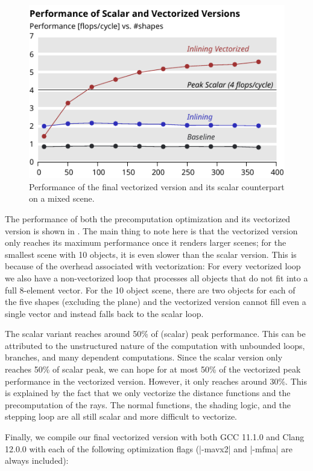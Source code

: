 \documentclass[letterpaper]{article}
\begin{document}
\begin{figure}[ht]
  \centering
  \includegraphics[page=4]{Figures/rep-all-perf.pdf}
  \caption{Performance of the final vectorized version and its scalar counterpart on a mixed scene.\label{fig:perf-all}}
\end{figure}

The performance of both the precomputation optimization and its vectorized version is shown in
.
The main thing to note here is that the vectorized version only reaches its maximum performance
once it renders larger scenes; for the smallest scene with 10 objects, it is even slower than
the scalar version.
This is because of the overhead associated with vectorization:
For every vectorized loop we also have a non-vectorized loop that processes all objects
that do not fit into a full 8-element vector.
For the 10 object scene, there are two objects for each of the five shapes (excluding the plane)
and the vectorized version cannot fill even a single vector and instead falls back to the scalar loop.

The scalar variant reaches around 50\% of (scalar) peak performance.
This can be attributed to the unstructured nature of the computation with unbounded loops, branches, and many dependent computations.
Since the scalar version only reaches 50\% of scalar peak, we can hope for at most 50\%
of the vectorized peak performance in the vectorized version.
However, it only reaches around 30\%.
This is explained by the fact that we only vectorize the distance functions and the precomputation of the rays.
The normal functions, the shading logic, and the stepping loop are all still scalar and more difficult to vectorize.

Finally, we compile our final vectorized version with both 
GCC 11.1.0 and Clang 12.0.0 with each of the following optimization flags 
(|-mavx2| and |-mfma| are always included):
\end{document}
